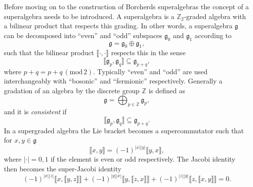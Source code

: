 Before moving on to the construction of Borcherds superalgebras the concept of a superalgebra needs to be introduced. A superalgebra is a $\mathbb{Z}_2$-graded algebra with a bilinear product that respects this grading. In other words, a superalgebra $\mathfrak{g}$ can be decomposed into ``even'' and ``odd'' subspaces $\mathfrak{g}_0$ and $\mathfrak{g}_1$ according to 
\begin{equation}
    \mathfrak{g} = \mathfrak{g}_0\oplus\mathfrak{g}_1,
\end{equation}
such that the bilinear product $\llbracket\cdot,\cdot\rrbracket$ respects this in the sense
\begin{equation}
    \llbracket\mathfrak{g}_p,\mathfrak{g}_q\rrbracket \subseteq \mathfrak{g}_{p+q},
\end{equation}
where $p+q = p+q\,(\text{mod}\,2)$. Typically ``even'' and ``odd'' are used interchangeably with ``bosonic'' and ``fermionic'' respectively. Generally a gradation of an algebra by the discrete group $\mathbb{Z}$ is defined as 
\begin{equation}
    \mathfrak{g} = \bigoplus_{p\in\mathbb{Z}} \mathfrak{g}_{p},
\end{equation}
and it is \emph{consistent} if 
\begin{equation}
    \llbracket \mathfrak{g}_p,\mathfrak{g}_q\rrbracket\subseteq \mathfrak{g}_{p+q}.
\end{equation}
In a supergraded algebra the Lie bracket becomes a supercommutator such that for $x,y\in\mathfrak{g}$
\begin{equation}
    \llbracket x,y\rrbracket = \left(-1\right)^{|x||y|}\llbracket y,x\rrbracket,
\end{equation}
where $|\cdot|=0,1$ if the element is even or odd respectively. The Jacobi identity then becomes the super-Jacobi identity
\begin{equation}
    \left(-1\right)^{|x||z|}\llbracket x,\llbracket y,z\rrbracket\rrbracket +\left(-1\right)^{|y||x|}\llbracket y,\llbracket z,x\rrbracket\rrbracket+\left(-1\right)^{|z||y|}\llbracket z,\llbracket x,y\rrbracket\rrbracket = 0.
\end{equation}

